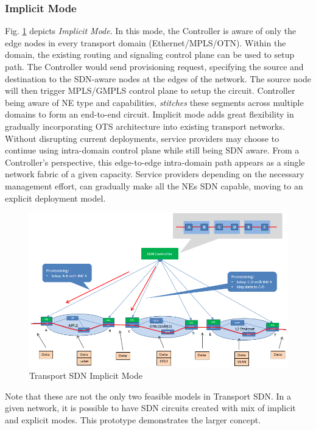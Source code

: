 \documentclass{sig-alternate-10pt}
\begin{document}
	\subsubsection{Implicit Mode} Fig. \ref{fig:OTSImplicit} depicts \textit{Implicit Mode}. In this mode,
	the Controller is aware of only the edge nodes in every transport domain (Ethernet/MPLS/OTN). Within the
	domain, the existing routing and signaling control plane can be used to setup path. The
	Controller would send provisioning request, specifying the source and destination to the SDN-aware nodes
	at the edges of the network. The source node will then trigger MPLS/GMPLS control plane to setup the circuit.
	Controller being aware of NE type and capabilities, \textit{stitches} these segments across multiple
	domains to form an end-to-end circuit. Implicit mode adds great flexibility in gradually incorporating
	OTS architecture into existing transport networks. Without disrupting current deployments, service
	providers may choose to continue using intra-domain control plane while still being SDN aware. From a
	Controller's perspective, this edge-to-edge intra-domain path appears as a single network fabric of a
	given capacity. Service providers depending on the necessary management effort, can gradually make
	all the NEs SDN capable, moving to an explicit deployment model.

	\begin{figure}[htb]
	\centering
	\includegraphics[scale=0.37]{OTSImplicit.png}
	\caption{Transport SDN Implicit Mode}
	\label{fig:OTSImplicit}
	\end{figure}

	Note that these are not the only two feasible models in Transport SDN. In a given network, it is possible to have
	SDN circuits created with mix of implicit and explicit modes. This prototype demonstrates the larger concept.
\end{document}
